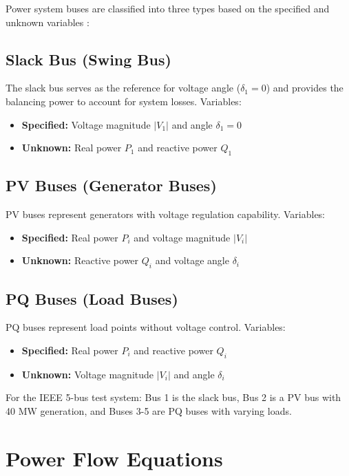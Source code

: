 \documentclass[11pt,a4paper]{article}
\begin{document}
Power system buses are classified into three types based on the specified and unknown variables \cite{Elgerd1982,Wood2013}:

\subsection{Slack Bus (Swing Bus)}

The slack bus serves as the reference for voltage angle ($\delta_1 = 0$) and provides the balancing power to account for system losses. Variables:
\begin{itemize}
    \item \textbf{Specified:} Voltage magnitude $|V_1|$ and angle $\delta_1 = 0$
    \item \textbf{Unknown:} Real power $P_1$ and reactive power $Q_1$
\end{itemize}

\subsection{PV Buses (Generator Buses)}

PV buses represent generators with voltage regulation capability. Variables:
\begin{itemize}
    \item \textbf{Specified:} Real power $P_i$ and voltage magnitude $|V_i|$
    \item \textbf{Unknown:} Reactive power $Q_i$ and voltage angle $\delta_i$
\end{itemize}

\subsection{PQ Buses (Load Buses)}

PQ buses represent load points without voltage control. Variables:
\begin{itemize}
    \item \textbf{Specified:} Real power $P_i$ and reactive power $Q_i$
    \item \textbf{Unknown:} Voltage magnitude $|V_i|$ and angle $\delta_i$
\end{itemize}

For the IEEE 5-bus test system: Bus 1 is the slack bus, Bus 2 is a PV bus with 40 MW generation, and Buses 3-5 are PQ buses with varying loads.

\section{Power Flow Equations}
\end{document}
